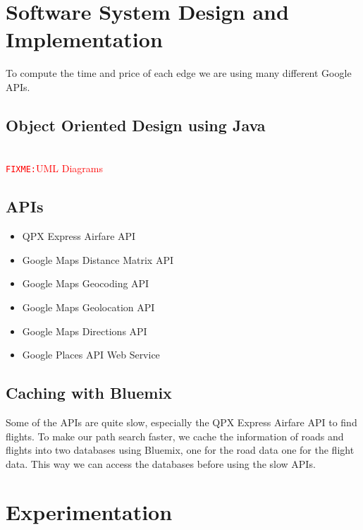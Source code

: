 \documentclass[11pt]{article}
\newcommand{\FIXME}[1]{ \ \\ \hspace* {-1.5 cm}
  \textcolor{red}{\texttt{FIXME:}#1} \medskip\par}
\begin{document}
\section{Software System Design and Implementation}
To compute the time and price of each edge we are using many different Google APIs.

\subsection{Object Oriented Design using Java}

\FIXME{UML Diagrams}

\subsection{APIs}

\begin{itemize}
\item QPX Express Airfare API
\item Google Maps Distance Matrix API
\item Google Maps Geocoding API
\item Google Maps Geolocation API
\item Google Maps Directions API
\item Google Places API Web Service
\end{itemize}

\subsection{Caching with Bluemix}
Some of the APIs are quite slow, especially the QPX Express Airfare API to find flights. To make our path search faster, we cache the information of roads and flights into two databases using Bluemix, one for the road data one for the flight data. This way we can access the databases before using the slow APIs.

\section{Experimentation}


\end{document}
